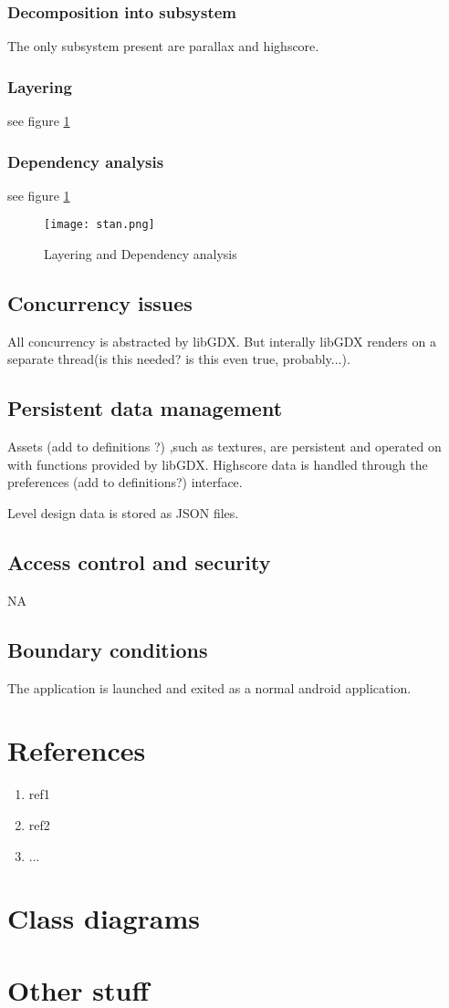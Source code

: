 \documentclass{article}
\begin{document}
\subsubsection{Decomposition into subsystem}
The only subsystem present are parallax and highscore.

\subsubsection{Layering}
see figure \ref{fig:stan}

\subsubsection{Dependency analysis}
see figure \ref{fig:stan}


\begin{figure}[h]
  \centering
  \texttt{[image: stan.png]}
  \caption{Layering and Dependency analysis}
  \label{fig:stan}
\end{figure}

\subsection{Concurrency issues}
All concurrency is abstracted by libGDX. But interally libGDX renders on a separate thread(is this needed? is this even true, probably...).

\subsection{Persistent data management}
Assets (add to definitions ?) ,such as textures, are persistent and operated on with functions provided by libGDX. Highscore data is handled through the preferences (add to definitions?) interface. 

Level design data is stored as JSON files.

\subsection{Access control and security}
NA


\subsection{Boundary conditions}
The application is launched and exited as a normal android application.

\section{References}
\begin{enumerate}
  \item ref1
  \item ref2
  \item ...
\end{enumerate}

\newpage
\begin{appendices}
  \section{Class diagrams}
  \section{Other stuff}
\end{appendices}
\end{document}
